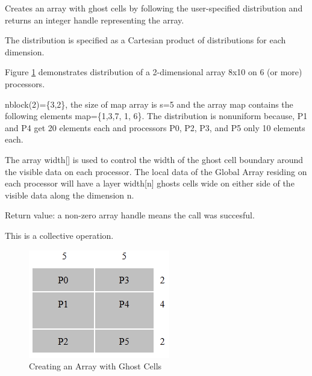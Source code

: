 \documentclass[12pt]{article}
\begin{document}
\begin{desc}

  Creates an array with ghost cells by following the user-specified
  distribution and returns an integer handle representing the array.

  The distribution is specified as a Cartesian product of
  distributions for each dimension. 

Figure \ref{crghostir} demonstrates distribution of a 2-dimensional
array 8x10 on 6 (or more) processors. 

nblock(2)=\{3,2\}, the size of map array is s=5 and the array map contains
the following elements map=\{1,3,7, 1, 6\}. The distribution is nonuniform
because, P1 and P4 get 20 elements each and processors P0, P2, P3, and P5
only 10 elements each.
 
The array width[] is used to control the width of the ghost cell boundary
around the visible data on each processor. The local data of the Global Array
residing on each processor will have a layer width[n] ghosts cells wide on
either side of the visible data along the dimension n. 

Return value: a non-zero array handle means the call was succesful. 

This is a collective operation.

\begin{figure}
\includegraphics{CrGhostIr}
\centering
\caption{Creating an Array with Ghost Cells}
\label{crghostir}
\end{figure}

\end{desc}


\end{document}
